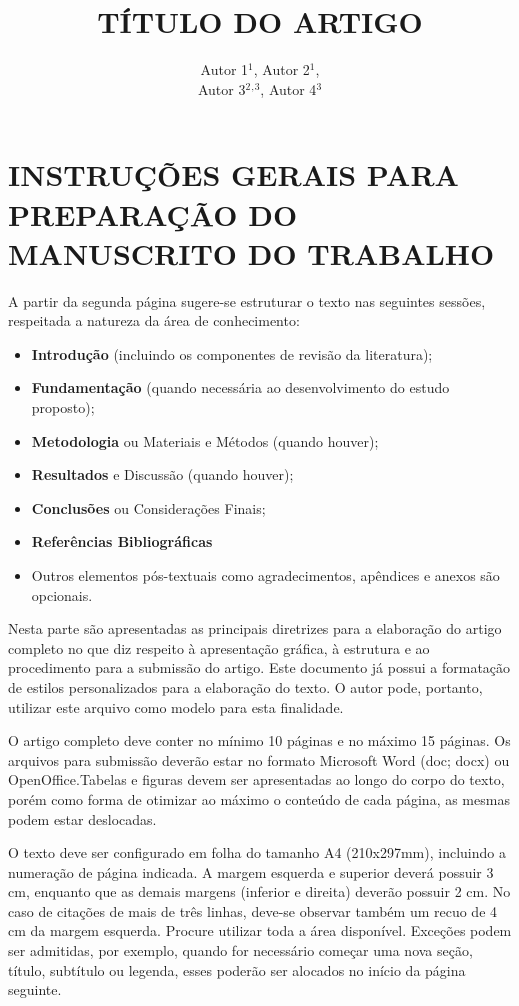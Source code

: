 \documentclass[10pt,brazil,english]{article}
\title{TÍTULO DO ARTIGO}
\author{Autor 1$^{1}$, Autor 2$^{1}$, \\ Autor 3$^{2}$$^{,}$$^{3}$, Autor 4$^{3}$ }
\begin{document}
\pagestyle{fancy} %

\maketitle
\newpage


\section{\uppercase{Instruções gerais para preparação do manuscrito do trabalho}}

A partir da segunda página sugere-se estruturar o texto nas seguintes sessões, respeitada a natureza da área de conhecimento:

\begin{itemize}
\item \textbf{Introdução} (incluindo os componentes de revisão da literatura);
\item	\textbf{Fundamentação} (quando necessária ao desenvolvimento do estudo proposto);
\item	\textbf{Metodologia} ou Materiais e Métodos (quando houver);
\item	\textbf{Resultados} e Discussão (quando houver);
\item	\textbf{Conclusões} ou Considerações Finais;
\item	\textbf{Referências Bibliográficas}
\item	Outros elementos pós-textuais como agradecimentos, apêndices e anexos são opcionais.

\end{itemize}

Nesta parte são apresentadas as principais diretrizes para a elaboração do artigo completo no que diz respeito à apresentação gráfica, à estrutura e ao procedimento para a submissão do artigo. Este documento já possui a formatação de estilos personalizados para a elaboração do texto. O autor pode, portanto, utilizar este arquivo como modelo para esta finalidade.

O artigo completo deve conter no mínimo 10 páginas e no máximo 15 páginas. Os arquivos para submissão deverão estar no formato Microsoft Word (doc; docx) ou OpenOffice.Tabelas e figuras devem ser apresentadas ao longo do corpo do texto, porém como forma de otimizar ao máximo o conteúdo de cada página, as mesmas podem estar deslocadas.

O texto deve ser configurado em folha do tamanho A4 (210x297mm), incluindo a numeração de página indicada. A margem esquerda e superior deverá possuir 3 cm, enquanto que as demais margens (inferior e direita) deverão possuir 2 cm. No caso de citações de mais de três linhas, deve-se observar também um recuo de 4 cm da margem esquerda. Procure utilizar toda a área disponível. Exceções podem ser admitidas, por exemplo, quando for necessário começar uma nova seção, título, subtítulo ou legenda, esses poderão ser alocados no início da página seguinte.
\end{document}
